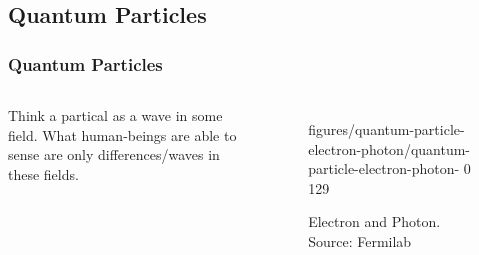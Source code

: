 \documentclass{beamer}
\begin{document}
\subsection{Quantum Particles}
\begin{frame}
  \frametitle{Quantum Particles}
  \begin{columns}
    Think a partical as a wave in some field.
    What human-beings are able to sense are only differences/waves in these fields.\tiny\cite{quantumparticle}
    \begin{figure}
      {figures/quantum-particle-electron-photon/quantum-particle-electron-photon-}
      {0}
      {129}
      \caption{Electron and Photon. Source: Fermilab}
    \end{figure}
  \end{columns}
\end{frame}
\end{document}
